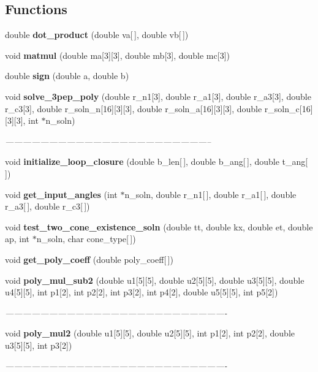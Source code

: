 \subsection*{Functions}
\begin{CompactItemize}
\item 
double {\bf dot\_\-product} (double va[$\,$], double vb[$\,$])
\item 
void {\bf matmul} (double ma[3][3], double mb[3], double mc[3])
\item 
double {\bf sign} (double a, double b)
\item 
void {\bf solve\_\-3pep\_\-poly} (double r\_\-n1[3], double r\_\-a1[3], double r\_\-a3[3], double r\_\-c3[3], double r\_\-soln\_\-n[16][3][3], double r\_\-soln\_\-a[16][3][3], double r\_\-soln\_\-c[16][3][3], int $\ast$n\_\-soln)
\begin{CompactList}\small\item\em ----------------------------------------------------------------------- \item\end{CompactList}\item 
void {\bf initialize\_\-loop\_\-closure} (double b\_\-len[$\,$], double b\_\-ang[$\,$], double t\_\-ang[$\,$])
\item 
void {\bf get\_\-input\_\-angles} (int $\ast$n\_\-soln, double r\_\-n1[$\,$], double r\_\-a1[$\,$], double r\_\-a3[$\,$], double r\_\-c3[$\,$])
\item 
void {\bf test\_\-two\_\-cone\_\-existence\_\-soln} (double tt, double kx, double et, double ap, int $\ast$n\_\-soln, char cone\_\-type[$\,$])
\item 
void {\bf get\_\-poly\_\-coeff} (double poly\_\-coeff[$\,$])
\item 
void {\bf poly\_\-mul\_\-sub2} (double u1[5][5], double u2[5][5], double u3[5][5], double u4[5][5], int p1[2], int p2[2], int p3[2], int p4[2], double u5[5][5], int p5[2])
\begin{CompactList}\small\item\em ---------------------------------------------------------------------------- \item\end{CompactList}\item 
void {\bf poly\_\-mul2} (double u1[5][5], double u2[5][5], int p1[2], int p2[2], double u3[5][5], int p3[2])
\begin{CompactList}\small\item\em ---------------------------------------------------------------------------- \item\end{CompactList}\item 

\end{CompactItemize}
